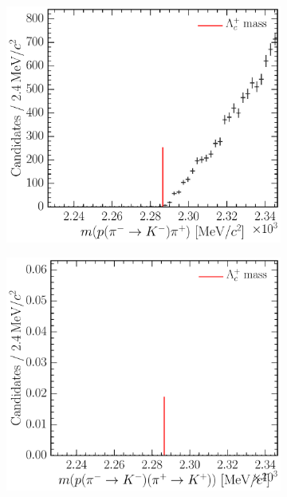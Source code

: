 \begin{figure}
\begin{subfigure}[b]{0.3\textwidth}
    \caption{\decay{\PLambdac}{\Ppiplus\Ppiminus\Pproton}}
    \label{fig:cpv:selection:background_study:ppipi_baryon:pipip}
  \end{subfigure}
  \begin{subfigure}[b]{0.3\textwidth}
    \includegraphics[width=\textwidth]{figures/cpv/selection/background_study/ppipi/LcToppipi_2012_MagDown_Lc_pp_pimTokm_pip}
    \caption{\decay{\PLambdac}{\Pproton\PKminus\Ppiplus}}
    \label{fig:cpv:selection:background_study:ppipi_baryon:pkpi}
  \end{subfigure}
  \begin{subfigure}[b]{0.3\textwidth}
    \includegraphics[width=\textwidth]{figures/cpv/selection/background_study/ppipi/LcToppipi_2012_MagDown_Lc_pp_pimTokm_pipTokp}

\end{subfigure}
\end{figure}

